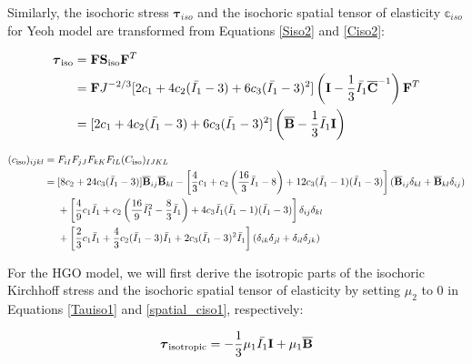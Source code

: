 \begin{appendices}
Similarly, the isochoric stress $\boldsymbol{\tau}_{iso}$ and the isochoric spatial tensor of elasticity $\mathbb{c}_{iso}$ for Yeoh model are transformed from Equations \ref{Siso2} and \ref{Ciso2}:

\begin{equation} \label{Tauiso2}
\begin{split}
\boldsymbol{\tau}_\mathrm{iso} 
&= \bold{F}\bold{S}_\mathrm{iso}{\bold{F}}^T \\
&= \bold{F}  J^{-2/3}[2c_1 + 4c_2(\bar{I_1} - 3) + 6c_3(\bar{I_1} - 3)^2] \left(\bold{I} - \frac{1}{3}\bar{I_1}{\overline{\bold{C}}}^{-1} \right)  \bold{F}^T \\
&= [2c_1 + 4c_2(\bar{I_1} - 3) + 6c_3(\bar{I_1} - 3)^2] \left(\overline{\bold{B}} - \frac{1}{3}\bar{I}_1\bold{I} \right)
\end{split}
\end{equation}

\begin{equation} \label{spatial_ciso2}
\begin{split}
(c_\mathrm{iso})_{ijkl} = {} &  F_{iI}F_{jJ}F_{kK}F_{lL}(C_\mathrm{iso})_{IJKL} \\
= {}& 
[8c_2+24c_3({\bar{I}}_1 - 3)] {\overline{\bold{B}}}_{ij}{\overline{\bold{B}}}_{kl} 
- \left[\frac{4}{3}c_1 + c_2\left(\frac{16}{3}{\bar{I}}_1 - 8\right) + 12c_3({\bar{I}}_1 - 1)({\bar{I}}_1 - 3)\right]({\overline{\bold{B}}}_{ij}\delta_{kl} + {\overline{\bold{B}}}_{kl}\delta_{ij}) \\
&+ \left[\frac{4}{9}c_1{\bar{I}}_1 + c_2\left(\frac{16}{9}{{\bar{I}}_1}^2 - \frac{8}{3}{\bar{I}}_1\right) + 4c_3{\bar{I}}_1({\bar{I}}_1 - 1)({\bar{I}}_1 - 3)\right] \delta_{ij}\delta_{kl} \\
&+ \left[\frac{2}{3}c_1{\bar{I}}_1 + \frac{4}{3}c_2({\bar{I}}_1 - 3){\bar{I}}_1 + 2c_3({\bar{I}}_1 - 3)^2{\bar{I}}_1\right](\delta_{ik}\delta_{jl} + \delta_{il}\delta_{jk})
\end{split}
\end{equation} 

For the HGO model, we will first derive the isotropic parts of the isochoric Kirchhoff stress and the isochoric spatial tensor of elasticity by setting $\mu_2$ to $0$ in Equations \ref{Tauiso1} and \ref{spatial_ciso1}, respectively:

\begin{equation} \label{Tauisotropic}
\boldsymbol{\tau}_\mathrm{isotropic} = - \frac{1}{3}\mu_1\bar{I_1}\bold{I} + \mu_1{\overline{\bold{B}}}
\end{equation}


\end{appendices}
